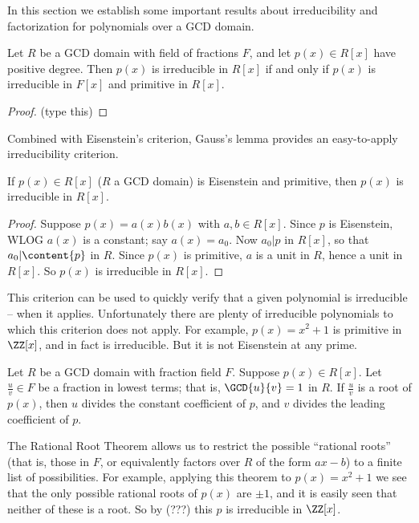 \documentclass{article}
\begin{document}

In this section we establish some important results about irreducibility and factorization for polynomials over a GCD domain.

\begin{prop}
Let $R$ be a GCD domain with field of fractions $F$, and let $p(x) \in R[x]$ have positive degree. Then $p(x)$ is irreducible in $R[x]$ if and only if $p(x)$ is irreducible in $F[x]$ and primitive in $R[x]$.
\end{prop}

\begin{proof}
(type this)
\end{proof}

Combined with Eisenstein's criterion, Gauss's lemma provides an easy-to-apply irreducibility criterion.

\begin{cor}
If $p(x) \in R[x]$ ($R$ a GCD domain) is Eisenstein and primitive, then $p(x)$ is irreducible in $R[x]$.
\end{cor}

\begin{proof}
Suppose $p(x) = a(x)b(x)$ with $a,b \in R[x]$. Since $p$ is Eisenstein, WLOG $a(x)$ is a constant; say $a(x) = a_0$. Now $a_0|p$ in $R[x]$, so that $a_0|\content{p}$ in $R$. Since $p(x)$ is primitive, $a$ is a unit in $R$, hence a unit in $R[x]$. So $p(x)$ is irreducible in $R[x]$.
\end{proof}

This criterion can be used to quickly verify that a given polynomial is irreducible -- when it applies. Unfortunately there are plenty of irreducible polynomials to which this criterion does not apply. For example, $p(x) = x^2 + 1$ is primitive in $\ZZ[x]$, and in fact is irreducible. But it is not Eisenstein at any prime.

\begin{prop}
Let $R$ be a GCD domain with fraction field $F$. Suppose $p(x) \in R[x]$. Let $\frac{u}{v} \in F$ be a fraction in lowest terms; that is, $\GCD{u}{v} = 1$ in $R$. If $\frac{u}{v}$ is a root of $p(x)$, then $u$ divides the constant coefficient of $p$, and $v$ divides the leading coefficient of $p$.
\end{prop}

The Rational Root Theorem allows us to restrict the possible ``rational roots'' (that is, those in $F$, or equivalently factors over $R$ of the form $ax-b$) to a finite list of possibilities. For example, applying this theorem to $p(x) = x^2 + 1$ we see that the only possible rational roots of $p(x)$ are $\pm 1$, and it is easily seen that neither of these is a root. So by (???) this $p$ is irreducible in $\ZZ[x]$.
\end{document}
